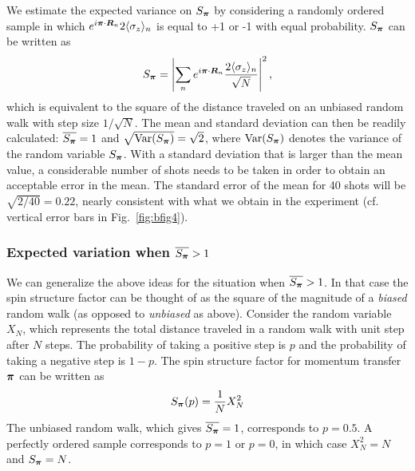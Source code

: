 We estimate the expected variance on $S_{\bm{\pi}}$ by considering a
randomly ordered sample in which
$e^{i\bm{\pi}\cdot\bm{R}_{n}}2\langle\sigma_{z}\rangle_{n} $  is equal to +1
or -1 with equal probability.  $S_{\bm{\pi}}$ can be written as
\begin{equation*}
  S_{\bm{\pi}} =
    \left| \sum_{n} e^{i\bm{\pi}\cdot \bm{R}_{n}}
    \frac{2 \langle \sigma_{z}  \rangle_{n} }{\sqrt{N}}  \right|^{2}, 
\end{equation*}
which is equivalent to the square of the distance traveled on an unbiased
random walk with step size $1/\sqrt{N}$.   The mean and standard deviation can
then be readily calculated: $\overline{S_{\bm{\pi}}}=1$ and
$\sqrt{\text{Var}(S_{\bm{\pi}})}=\sqrt{2}$, where $\text{Var}(S_{\bm{\pi}})$
denotes the variance of the random variable $S_{\bm{\pi}}$.  With a standard
deviation that is larger than the mean value, a considerable number of shots
needs to be taken in order to obtain an acceptable error in the mean.    The
standard error of the mean for 40 shots will be $\sqrt{2/40}=0.22$, nearly
consistent with what we obtain in the experiment (cf. vertical error bars in
Fig.~\ref{fig:bfig4}).

\subsubsection{Expected variation when $\overline{S_{\bm{\pi}}} > 1$}

We can generalize the above ideas for the situation when
$\overline{S_{\bm{\pi}}} > 1$.  In that case the spin structure factor can
be thought of as the square of the magnitude of a \textit{biased} random
walk (as opposed to \textit{unbiased} as above).  Consider the random
variable $X_{N}$, which represents the total distance traveled in a random
walk with unit step after $N$ steps.  The probability of taking a positive
step is $p$ and the probability of taking a negative step is $1-p$. The spin
structure factor for momentum transfer $\bm{\pi}$ can be written as  
\begin{equation*}
  S_{\bm{\pi}}(p) = \frac{1}{N}  X_{N}^{2}  
\end{equation*}
The unbiased random walk, which gives $\overline{S_{\bm{\pi}}}=1$,
corresponds to $p=0.5$.  A perfectly ordered sample corresponds to $p=1$ or
$p=0$, in which case $X_{N}^{2}=N$ and $S_{\bm{\pi}}=N$.

